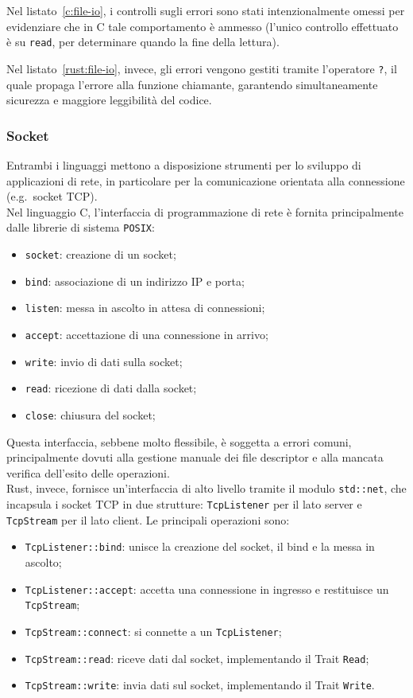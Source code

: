 Nel listato~\ref{c:file-io}, i controlli sugli errori sono stati intenzionalmente omessi per evidenziare che in C tale comportamento è ammesso (l'unico controllo effettuato è su \texttt{read}, per determinare quando la fine della lettura).

Nel listato~\ref{rust:file-io}, invece, gli errori vengono gestiti tramite l'operatore \texttt{?}, il quale propaga l'errore alla funzione chiamante, garantendo simultaneamente sicurezza e maggiore leggibilità del codice.

\subsubsection{Socket}
Entrambi i linguaggi mettono a disposizione strumenti per lo sviluppo di applicazioni di rete, in particolare per 
la comunicazione orientata alla connessione (e.g.\  socket TCP). \hfill
\vspace{8pt}\\
\noindent Nel linguaggio C, l'interfaccia di programmazione di rete è fornita principalmente dalle librerie di sistema \texttt{POSIX}:\ 
\begin{itemize}
    \item \texttt{socket}: creazione di un socket;
    \item \texttt{bind}: associazione di un indirizzo IP e porta;
    \item \texttt{listen}: messa in ascolto in attesa di connessioni;
    \item \texttt{accept}: accettazione di una connessione in arrivo;
    \item \texttt{write}: invio di dati sulla socket;
    \item \texttt{read}: ricezione di dati dalla socket;
    \item \texttt{close}: chiusura del socket;
\end{itemize}
Questa interfaccia, sebbene molto flessibile, è soggetta a errori comuni, principalmente dovuti alla gestione manuale dei file descriptor e alla mancata verifica dell'esito delle operazioni. \hfill
\vspace{8pt}\\
\noindent Rust, invece, fornisce un'interfaccia di alto livello tramite il modulo \texttt{std::net},
che incapsula i socket TCP in due strutture: \texttt{TcpListener} per il lato server e \texttt{TcpStream} per il lato client.
Le principali operazioni sono:
\begin{itemize}
    \item \texttt{TcpListener::bind}: unisce la creazione del socket, il bind e la messa in ascolto;
    \item \texttt{TcpListener::accept}: accetta una connessione in ingresso e restituisce un \texttt{TcpStream};
    \item \texttt{TcpStream::connect}: si connette a un \texttt{TcpListener};
    \item \texttt{TcpStream::read}: riceve dati dal socket, implementando il Trait \texttt{Read};
    \item \texttt{TcpStream::write}: invia dati sul socket, implementando il Trait \texttt{Write}.
\end{itemize}
